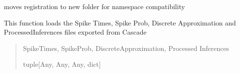 \documentclass[letterpaper,10pt,english]{sphinxmanual}
\begin{document}
\begin{fulllineitems}
\begin{fulllineitems}
\label{\detokenize{Organization:Organization.ImagingAnalysis.default_folders}}
\pysigstartsignatures
{}
\pysigstopsignatures
\end{fulllineitems}


\begin{fulllineitems}
\label{\detokenize{Organization:Organization.ImagingAnalysis.export_registration_to_denoised}}
\pysigstartsignatures
{}
\pysigstopsignatures
\sphinxAtStartPar
moves registration to new folder for namespace compatibility
\begin{quote}\begin{description}
\sphinxAtStartPar


\end{description}\end{quote}

\end{fulllineitems}


\begin{fulllineitems}
\label{\detokenize{Organization:Organization.ImagingAnalysis.load_cascade_exports}}
\pysigstartsignatures
{}
\pysigstopsignatures
\sphinxAtStartPar
This function loads the Spike Times, Spike Prob, Discrete Approximation and ProcessedInferences files exported from Cascade
\begin{quote}\begin{description}
\sphinxAtStartPar
SpikeTimes, SpikeProb, DiscreteApproximation, Processed Inferences

\sphinxAtStartPar
tuple{[}Any, Any, Any, dict{]}

\end{description}\end{quote}


\end{fulllineitems}
\end{fulllineitems}
\end{document}
